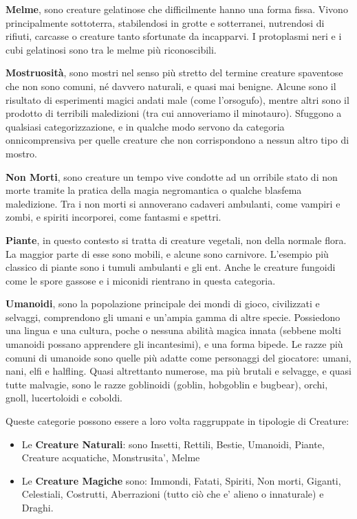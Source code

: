 \begin{multicols}{2}
\medskip\textbf{Melme}, sono creature gelatinose che difficilmente hanno una forma fissa. Vivono principalmente sottoterra, stabilendosi in grotte e sotterranei, nutrendosi di rifiuti, carcasse o creature tanto sfortunate da incapparvi. I protoplasmi neri e i cubi gelatinosi sono tra le melme più riconoscibili.

\medskip\textbf{Mostruosità}, sono mostri nel senso più stretto del termine creature spaventose che non sono comuni, né davvero naturali, e quasi mai benigne. Alcune sono il risultato di esperimenti magici andati male (come l'orsogufo), mentre altri sono il prodotto di terribili maledizioni (tra cui annoveriamo il minotauro). Sfuggono a qualsiasi categorizzazione, e in qualche modo servono da categoria onnicomprensiva per quelle creature che non corrispondono a nessun altro tipo di mostro. 

\medskip\textbf{Non Morti}, sono creature un tempo vive condotte ad un orribile stato di non morte tramite la pratica della magia negromantica o qualche blasfema maledizione. Tra i non morti si annoverano cadaveri ambulanti, come vampiri e zombi, e spiriti incorporei, come fantasmi e spettri.

\medskip\textbf{Piante}, in questo contesto si tratta di creature vegetali, non della normale flora. La maggior parte di esse sono mobili, e alcune sono carnivore. L'esempio più classico di piante sono i tumuli ambulanti e gli ent. Anche le creature fungoidi come le spore gassose e i miconidi rientrano in questa categoria.

\medskip\textbf{Umanoidi}, sono la popolazione principale dei mondi di gioco, civilizzati e selvaggi, comprendono gli umani e un'ampia gamma di altre specie. Possiedono una lingua e una cultura, poche o nessuna abilità magica innata (sebbene molti umanoidi possano apprendere gli incantesimi), e una forma bipede. Le razze più comuni di umanoide sono quelle più adatte come personaggi del giocatore: umani, nani, elfi e halfling. Quasi altrettanto numerose, ma più brutali e selvagge, e quasi tutte malvagie, sono le razze goblinoidi (goblin, hobgoblin e bugbear), orchi, gnoll, lucertoloidi e coboldi.\\

\medskip

Queste categorie possono essere a loro volta raggruppate in tipologie di Creature:
\smallskip
\begin{itemize}
\item
Le \textbf{Creature Naturali}: sono Insetti, Rettili, Bestie, Umanoidi, Piante, Creature acquatiche, Monstrusita', Melme
\item
Le \textbf{Creature Magiche} sono: Immondi, Fatati, Spiriti, Non morti, Giganti, Celestiali, Costrutti, Aberrazioni (tutto ciò che e' alieno o innaturale) e Draghi.


\end{itemize}
\end{multicols}
